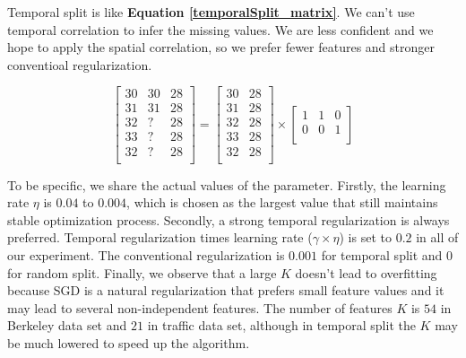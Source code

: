 Temporal split is like \textbf{Equation \ref{temporalSplit_matrix}}. We can't use temporal correlation to infer the missing values. We are less confident and we hope to apply the spatial correlation, so we prefer fewer features and stronger conventioal regularization.

\begin{equation}
\label{temporalSplit_matrix}
\begin{bmatrix}
30 & 30 & 28\\
31 & 31 & 28\\
32 &  ? & 28\\
33 &  ? & 28\\
32 &  ? & 28\\
\end{bmatrix} 
= 
\begin{bmatrix}
30 & 28\\
31 & 28\\
32 & 28\\
33 & 28\\
32 & 28\\
\end{bmatrix} 
\times
\begin{bmatrix}
1 & 1 & 0\\
0 & 0 & 1\\
\end{bmatrix} 
\end{equation}

To be specific, we share the actual values of the parameter. Firstly, the learning rate $\eta$ is $0.04$ to $0.004$, which is chosen as the largest value that still maintains stable optimization process. Secondly, a strong temporal regularization is always preferred. Temporal regularization times learning rate ($\gamma \times \eta$) is set to $0.2$ in all of our experiment. The conventional regularization is $0.001$ for temporal split and $0$ for random split. Finally, we observe that a large $K$ doesn't lead to overfitting because SGD is a natural regularization that prefers small feature values and it may lead to several non-independent features. The number of features $K$ is $54$ in Berkeley data set and $21$ in traffic data set, although in temporal split the $K$ may be much lowered to speed up the algorithm. 


